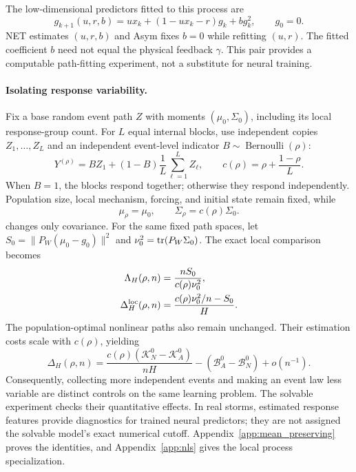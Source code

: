 The low-dimensional predictors fitted to this process are
\begin{equation}
 g_{k+1}(u,r,b)=ux_k+(1-ux_k-r)g_k+b g_k^2,
 \qquad g_0=0.
 \label{eq:fitted_model}
\end{equation}
NET estimates $(u,r,b)$ and Asym fixes $b=0$ while refitting $(u,r)$. The fitted coefficient $b$ need not equal the physical feedback $\gamma$. This pair provides a computable path-fitting experiment, not a substitute for neural training.

\paragraph{Isolating response variability.}
Fix a base random event path $Z$ with moments $(\mu_0,\Sigma_0)$, including its local response-group count. For $L$ equal internal blocks, use independent copies $Z_1,\ldots,Z_L$ and an independent event-level indicator $B\sim\operatorname{Bernoulli}(\rho)$:
\begin{equation}
 Y^{(\rho)}=B Z_1+(1-B)\frac1L\sum_{\ell=1}^L Z_\ell,
 \qquad c(\rho)=\rho+\frac{1-\rho}{L}.
 \label{eq:law_intervention}
\end{equation}
When $B=1$, the blocks respond together; otherwise they respond independently. Population size, local mechanism, forcing, and initial state remain fixed, while
\begin{equation}
 \mu_\rho=\mu_0,\qquad \Sigma_\rho=c(\rho)\Sigma_0.
 \label{eq:fixed_mean_cov}
\end{equation}
changes only covariance. For the same fixed path spaces, let $S_0=\|P_W(\mu_0-g_0)\|^2$ and $\nu_0^2=\operatorname{tr}(P_W\Sigma_0)$. The exact local comparison becomes
\begin{equation}
 \begin{aligned}
 \Lambda_H(\rho,n)&=\frac{nS_0}{c(\rho)\nu_0^2},\\
 \Delta_H^{\rm loc}(\rho,n)&=\frac{c(\rho)\nu_0^2/n-S_0}{H}.
 \end{aligned}
 \label{eq:law_index}
\end{equation}
The population-optimal nonlinear paths also remain unchanged. Their estimation costs scale with $c(\rho)$, yielding
\begin{equation}
 \Delta_H(\rho,n)
 =\frac{c(\rho)(\mathcal K_N^0-\mathcal K_A^0)}{nH}
  -(\mathcal B_A^0-\mathcal B_N^0)+o(n^{-1}).
 \label{eq:nonlinear_law}
\end{equation}
Consequently, collecting more independent events and making an event law less variable are distinct controls on the same learning problem. The solvable experiment checks their quantitative effects. In real storms, estimated response features provide diagnostics for trained neural predictors; they are not assigned the solvable model's exact numerical cutoff. Appendix~\ref{app:mean_preserving} proves the identities, and Appendix~\ref{app:nls} gives the local process specialization.


